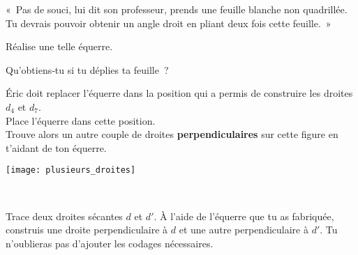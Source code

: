 \begin{activite}
\begin{partie}
\begin{enumerate}
   \end{enumerate} 

  \end{partie}

\end{activite}


\begin{activite}

 \begin{minipage}[c]{0.50\linewidth}
  \begin{partie}
 
  « Pas de souci, lui dit son professeur, prends une feuille blanche non quadrillée. Tu devrais pouvoir obtenir un angle droit en pliant deux fois cette feuille. »
  
  Réalise une telle équerre.
  
  Qu'obtiens‑tu si tu déplies ta feuille ? 
    \end{partie}
  
  \begin{partie}
  
  Éric doit replacer l'équerre dans la position qui a permis de construire les droites $d_4$ et $d_7$. \\[0.5em]
  Place l'équerre dans cette position. \\[0.5em]
  Trouve alors un autre couple de droites \textbf{perpendiculaires} sur cette figure en t'aidant de ton équerre.
    \end{partie} \end{minipage} \hfill %
   \begin{minipage}[c]{0.44\linewidth}
   \texttt{[image: plusieurs\_droites]}
   \end{minipage} \\

 \begin{partie}
 
Trace deux droites sécantes $d$ et $d'$. À l'aide de l'équerre que tu as fabriquée, construis une droite perpendiculaire à $d$ et une autre perpendiculaire à $d'$. Tu n'oublieras pas d'ajouter les codages nécessaires.

  \end{partie} 
  
\end{activite}

